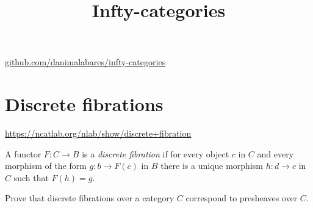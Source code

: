 



\title{Infty-categories}
\maketitle

\label{section-phantom}
\hfill
\href{http://github.com/danimalabares/infty-categories}
{github.com/danimalabares/infty-categories}

\tableofcontents

\section{Discrete fibrations}
\label{section-discrete-fibrations}

\begin{definition}
\label{definition-discrete-fibration}
\begin{reference}
\url{https://ncatlab.org/nlab/show/discrete+fibration} 
\end{reference}
A functor $F:C \to B$ is a {\it discrete fibration} if for every object
$c$ in $C$ and every morphism of the form $g: b \to F(c)$ in $B$ 
there is a unique morphism $h:d \to c$ in $C$ 
such that $F(h)=g$.
\end{definition}

\begin{exercise}
\label{exercise-discrete-fibrations-over-category-are-presheaves}
Prove that discrete fibrations over a category $C$ correspond to presheaves over
$C$.
\end{exercise}

